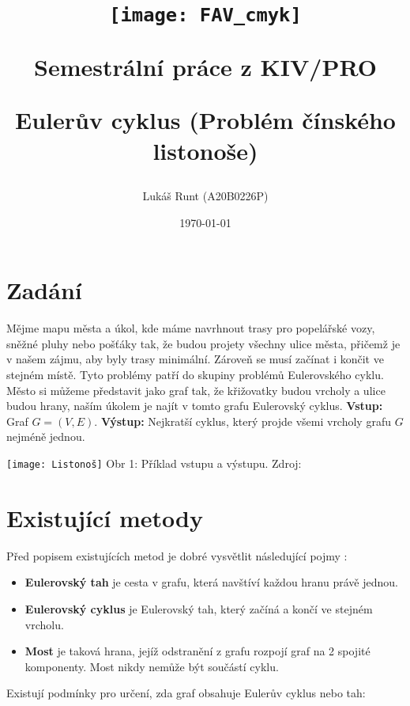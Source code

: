 \documentclass[12pt, a4paper]{article}
\title{\texttt{[image: FAV\_cmyk]}

{\huge Semestrální práce z KIV/PRO}

\vspace{0.5cm}
{\LARGE Eulerův cyklus (Problém čínského listonoše)}
\vspace{1cm}
}
\author{Lukáš Runt (A20B0226P)}
\date{\vspace{7.5cm} \today}
\begin{document}
\begin{titlepage}
\clearpage\maketitle
\thispagestyle{empty}
\end{titlepage}

\tableofcontents
\newpage
\section{Zadání}
Mějme mapu města a úkol, kde máme navrhnout trasy pro popelářské vozy, sněžné pluhy nebo pošťáky tak, že budou projety všechny ulice města, přičemž je v našem zájmu, aby byly trasy minimální. Zároveň se musí začínat i končit ve stejném místě. Tyto problémy patří do skupiny problémů Eulerovského cyklu. Město si můžeme představit jako graf tak, že křižovatky budou vrcholy a ulice budou hrany, naším úkolem je najít v tomto grafu Eulerovský cyklus.
\vspace{0.5cm}
\newline\textbf{Vstup:} Graf $G = (V, E)$.
\vspace{0.5cm}
\newline\textbf{Výstup:} Nejkratší cyklus, který projde všemi vrcholy grafu $G$ nejméně jednou.
\begin{center}
	\texttt{[image: Listonoš]}
	\newline Obr 1: Příklad vstupu a výstupu. Zdroj: \cite{skiena1998algorithm}
\end{center}
\section{Existující metody}
Před popisem existujících metod je dobré vysvětlit následující pojmy \cite{Fleury}:
\begin{itemize}
\item \textbf{Eulerovský tah} je cesta v grafu, která navštíví každou hranu právě jednou.
\item \textbf{Eulerovský cyklus} je Eulerovský tah, který začíná a končí ve stejném vrcholu.
\item \textbf{Most} je taková hrana, jejíž odstranění z grafu rozpojí graf na 2 spojité komponenty. Most nikdy nemůže být součástí cyklu.
\end{itemize}
\newpage Existují podmínky pro určení, zda graf obsahuje Eulerův cyklus nebo tah:
\end{document}
